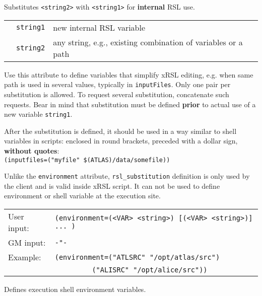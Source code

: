   Substitutes \verb#<string2># with \verb#<string1># for
  \textbf{internal} RSL use.

  \begin{tabular}{llp{10cm}}
    \hspace*{1cm}&\texttt{string1} & new internal RSL variable\\
    \hspace*{1cm}&\texttt{string2} & any string, e.g., existing combination of
    variables or a path\\
  \end{tabular}
  
  Use this attribute to define variables that simplify xRSL editing,
  e.g. when same path is used in several values, typically in
  \texttt{inputFiles}. Only one pair per substitution is allowed. To
  request several substitution, concatenate such requests. Bear in
  mind that substitution must be defined \textbf{prior} to actual use
  of a new variable \texttt{string1}.

  After the substitution is defined, it should be used in a way
  similar to shell variables in scripts: enclosed in round brackets,
  preceded with a dollar sign, \textbf{without quotes}:\\
  \verb#(inputfiles=("myfile" $(ATLAS)/data/somefile))#

  Unlike the \texttt{environment} attribute, \texttt{rsl\_substitution}
  definition is only used by the client and is valid inside xRSL
  script. It can not be used to define environment or shell variable
  at the execution site.

  \hspace*{0.5cm}
  \begin{shaded}
  \end{shaded}
  \begin{tabular}{lp{13cm}}
    User input:&\verb#(environment=(<VAR> <string>) [(<VAR> <string>)] ... )#\\
    GM input:&\verb#-"-#\\
    Example:&\verb#(environment=("ATLSRC" "/opt/atlas/src")#\\
    &\verb#         ("ALISRC" "/opt/alice/src"))#\\
  \end{tabular}

  Defines execution shell environment variables.


